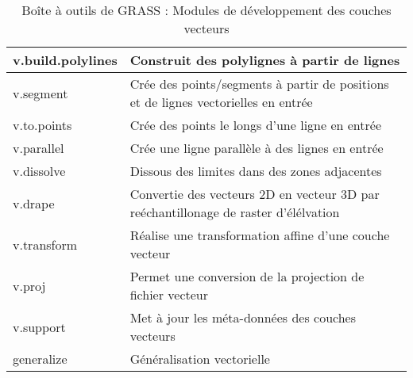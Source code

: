 {\begin{table}[H]
\begin{tabular}{|p{3cm}|p{11cm}|}
  \hline v.build.polylines & Construit des polylignes à partir de lignes\\
  \hline v.segment & Crée des points/segments à partir de positions et de lignes vectorielles en entrée\\
  \hline v.to.points & Crée des points le longs d'une ligne en entrée\\
  \hline v.parallel & Crée une ligne parallèle à des lignes en entrée\\
  \hline v.dissolve & Dissous des limites dans des zones adjacentes\\
  \hline v.drape & Convertie des vecteurs 2D en vecteur 3D par reéchantillonage de raster d'élélvation\\
  \hline v.transform & Réalise une transformation affine d'une couche vecteur\\
  \hline v.proj & Permet une conversion de la projection de fichier vecteur\\
  \hline v.support & Met à jour les méta-données des couches vecteurs\\
  \hline generalize & Généralisation vectorielle\\
\hline
\end{tabular}
\caption{Boîte à outils de GRASS : Modules de développement des couches vecteurs}
\end{table}}


